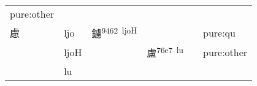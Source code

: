 \documentclass[14pt,a4paper]{scrartcl}
\begin{document}
\begin{longtable}[c]{@{}llllll@{}}
\begin{minipage}[t]{0.14\columnwidth}
pure:other
\strut\end{minipage}\tabularnewline
\begin{minipage}[t]{0.14\columnwidth}\raggedright\strut
慮
\strut\end{minipage} &
\begin{minipage}[t]{0.14\columnwidth}\raggedright\strut
ljo
\strut\end{minipage} &
\begin{minipage}[t]{0.14\columnwidth}\raggedright\strut
鑢\textsuperscript{9462~ljoH}
\strut\end{minipage} &
\begin{minipage}[t]{0.14\columnwidth}\raggedright\strut
\strut\end{minipage} &
\begin{minipage}[t]{0.14\columnwidth}\raggedright\strut
\strut\end{minipage} &
\begin{minipage}[t]{0.14\columnwidth}\raggedright\strut
pure:qu
\strut\end{minipage}\tabularnewline
\begin{minipage}[t]{0.14\columnwidth}\raggedright\strut
𧆣
\strut\end{minipage} &
\begin{minipage}[t]{0.14\columnwidth}\raggedright\strut
ljoH
\strut\end{minipage} &
\begin{minipage}[t]{0.14\columnwidth}\raggedright\strut
\strut\end{minipage} &
\begin{minipage}[t]{0.14\columnwidth}\raggedright\strut
盧\textsuperscript{76e7~lu}
\strut\end{minipage} &
\begin{minipage}[t]{0.14\columnwidth}\raggedright\strut
\strut\end{minipage} &
\begin{minipage}[t]{0.14\columnwidth}\raggedright\strut
pure:other
\strut\end{minipage}\tabularnewline
\begin{minipage}[t]{0.14\columnwidth}\raggedright\strut
𧆨
\strut\end{minipage} &
\begin{minipage}[t]{0.14\columnwidth}\raggedright\strut
lu
\strut\end{minipage} &
\begin{minipage}[t]{0.14\columnwidth}\raggedright\strut
\strut\end{minipage} &
\begin{minipage}[t]{0.14\columnwidth}\raggedright\strut

\end{minipage}
\end{longtable}
\end{document}
